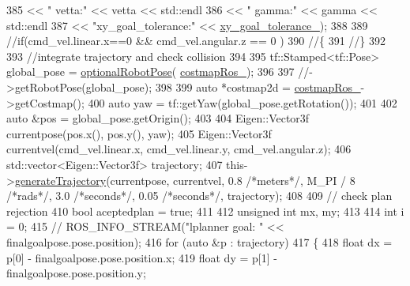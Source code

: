 \begin{DoxyCode}
{385                                               << \textcolor{stringliteral}{" vetta:"} << vetta << std::endl
386                                               << \textcolor{stringliteral}{" gamma:"} << gamma << std::endl
387                                               << \textcolor{stringliteral}{"xy\_goal\_tolerance:"} << 
      \hyperlink{classcl__move__base__z_1_1forward__local__planner_1_1ForwardLocalPlanner_acd2ed91ee166f03faeeb9d6a4b91084b}{xy\_goal\_tolerance\_});
388 
389     \textcolor{comment}{//if(cmd\_vel.linear.x==0 && cmd\_vel.angular.z == 0 )}
390     \textcolor{comment}{//\{}
391     \textcolor{comment}{//\}}
392 
393     \textcolor{comment}{//integrate trajectory and check collision}
394 
395     tf::Stamped<tf::Pose> global\_pose = \hyperlink{namespacecl__move__base__z_1_1forward__local__planner_a4c20f9fe0ca67779c53e90182baf4997}{optionalRobotPose}(
      \hyperlink{classcl__move__base__z_1_1forward__local__planner_1_1ForwardLocalPlanner_a37791fea67ce92c6e38e3727311e533b}{costmapRos\_});
396     
397     \textcolor{comment}{//->getRobotPose(global\_pose);}
398 
399     \textcolor{keyword}{auto} *costmap2d = \hyperlink{classcl__move__base__z_1_1forward__local__planner_1_1ForwardLocalPlanner_a37791fea67ce92c6e38e3727311e533b}{costmapRos\_}->getCostmap();
400     \textcolor{keyword}{auto} yaw = tf::getYaw(global\_pose.getRotation());
401 
402     \textcolor{keyword}{auto} &pos = global\_pose.getOrigin();
403 
404     Eigen::Vector3f currentpose(pos.x(), pos.y(), yaw);
405     Eigen::Vector3f currentvel(cmd\_vel.linear.x, cmd\_vel.linear.y, cmd\_vel.angular.z);
406     std::vector<Eigen::Vector3f> trajectory;
407     this->\hyperlink{classcl__move__base__z_1_1forward__local__planner_1_1ForwardLocalPlanner_a3e852f81ccae82c56d7f25e56def899c}{generateTrajectory}(currentpose, currentvel, 0.8 \textcolor{comment}{/*meters*/}, M\_PI / 8 \textcolor{comment}{/*rads*/}, 
      3.0 \textcolor{comment}{/*seconds*/}, 0.05 \textcolor{comment}{/*seconds*/}, trajectory);
408 
409     \textcolor{comment}{// check plan rejection}
410     \textcolor{keywordtype}{bool} aceptedplan = \textcolor{keyword}{true};
411 
412     \textcolor{keywordtype}{unsigned} \textcolor{keywordtype}{int} mx, my;
413 
414     \textcolor{keywordtype}{int} i = 0;
415     \textcolor{comment}{// ROS\_INFO\_STREAM("lplanner goal: " << finalgoalpose.pose.position);}
416     \textcolor{keywordflow}{for} (\textcolor{keyword}{auto} &p : trajectory)
417     \{
418         \textcolor{keywordtype}{float} dx = p[0] - finalgoalpose.pose.position.x;
419         \textcolor{keywordtype}{float} dy = p[1] - finalgoalpose.pose.position.y;
}
\end{DoxyCode}
